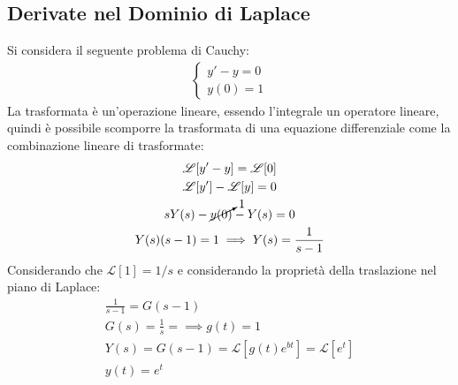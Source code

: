 \documentclass{article}
\numberwithin{equation}{subsection}
\begin{document}
\subsection{Derivate nel Dominio di Laplace}

Si considera il seguente problema di Cauchy:
\begin{gather*}
    \begin{cases}
        y'-y=0\\
        y(0)=1
    \end{cases}
\end{gather*}
La trasformata è un'operazione lineare, essendo l'integrale un operatore lineare, quindi è possibile scomporre la trasformata di una equazione differenziale come la combinazione lineare di trasformate:
\begin{gather*}
    \mathscr{L}[y'-y]=\mathscr{L}[0]\\
    \mathscr{L}[y']-\mathscr{L}[y]=0\\
    sY(s)-\cancelto{1}{y(0)}-Y(s)=0\\
    Y(s)(s-1)=1\implies Y(s)=\frac{1}{s-1}
\end{gather*}
Considerando che $\mathscr{L}[1]=1/s$ e considerando la proprietà della traslazione nel piano di Laplace:
\begin{gather*}
    \frac{1}{s-1}=G(s-1)\\
    G(s)=\frac{1}{s}=\implies g(t)=1\\
    Y(s)=G(s-1)=\mathscr{L}[g(t)e^{bt}]=\mathscr{L}[e^t]\\
    y(t)=e^{t}
\end{gather*}
\end{document}
